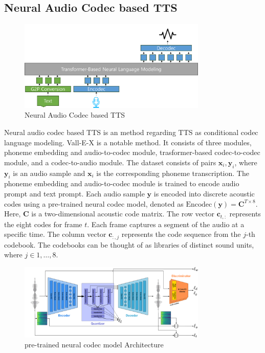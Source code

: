 \subsection{Neural Audio Codec based TTS}
\label{subsec:neural_audio_codec_based_tts}
\begin{figure}
    \centering
    \includegraphics[width=0.8\textwidth]{figures/figure_chap_2/valle.png}
    \caption{Neural Audio Codec based TTS}
    \label{fig:Valle}
\end{figure}
Neural audio codec based TTS is an method regarding TTS as conditional codec language modeling.
Vall-E-X\cite{Vall-E-X} is a notable method. It consists of three modules, phoneme embedding and audio-to-codec module, trasformer-based codec-to-codec module, and a codec-to-audio module.
The dataset consists of pairs ${\mathbf{x}_i , \mathbf{y}_i }$, where $\mathbf{y}_i$ is an audio sample and $\mathbf{x}_i$ is the corresponding phoneme transcription.
The phoneme embedding and audio-to-codec module is trained to encode audio prompt and text prompt.
Each audio sample $\mathbf{y}$ is encoded into discrete acoustic codes using a pre-trained neural codec model\cite{EnCodec}, denoted as $\text{Encodec}(\mathbf{y}) = \mathbf{C}^{T \times 8}$. Here, $\mathbf{C}$ is a two-dimensional acoustic code matrix.
The row vector $\mathbf{c}_{t,:}$ represents the eight codes for frame $t$. Each frame captures a segment of the audio at a specific time.
The column vector $\mathbf{c}_{:, j}$ represents the code sequence from the $j$-th codebook. The codebooks can be thought of as libraries of distinct sound units, where $j \in {1, \ldots, 8}$.

\begin{figure}
    \centering
    \includegraphics[width=0.8\textwidth]{figures/figure_chap_2/encodec.png}
    \caption{pre-trained neural codec model Architecture}
    \label{fig:EnCodec}
\end{figure}

